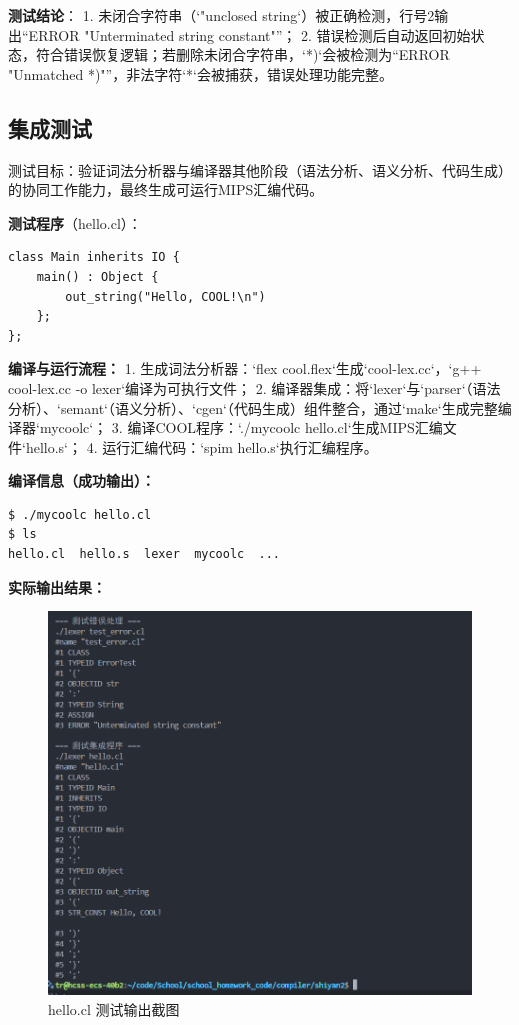 \documentclass[twocolumn]{article}
\begin{document}
\textbf{测试结论}：
1. 未闭合字符串（`"unclosed string`）被正确检测，行号2输出“ERROR "Unterminated string constant"”；
2. 错误检测后自动返回初始状态，符合错误恢复逻辑；若删除未闭合字符串，`*)`会被检测为“ERROR "Unmatched *)"”，非法字符`*`会被捕获，错误处理功能完整。

\subsection{集成测试}


测试目标：验证词法分析器与编译器其他阶段（语法分析、语义分析、代码生成）的协同工作能力，最终生成可运行MIPS汇编代码。

\textbf{测试程序}（hello.cl）：
\begin{lstlisting}[language=cool, caption={集成测试程序}]
class Main inherits IO {
    main() : Object {
        out_string("Hello, COOL!\n")
    };
};
\end{lstlisting}

\textbf{编译与运行流程：}
1. 生成词法分析器：`flex cool.flex`生成`cool-lex.cc`，`g++ cool-lex.cc -o lexer`编译为可执行文件；
2. 编译器集成：将`lexer`与`parser`（语法分析）、`semant`（语义分析）、`cgen`（代码生成）组件整合，通过`make`生成完整编译器`mycoolc`；
3. 编译COOL程序：`./mycoolc hello.cl`生成MIPS汇编文件`hello.s`；
4. 运行汇编代码：`spim hello.s`执行汇编程序。

\textbf{编译信息（成功输出）：}
\begin{verbatim}
$ ./mycoolc hello.cl
$ ls
hello.cl  hello.s  lexer  mycoolc  ...
\end{verbatim}

\textbf{实际输出结果：}
\begin{figure}[H]
    \centering
    \includegraphics[width=0.95\linewidth]{hello.png}  %
    \caption{hello.cl 测试输出截图}  %
\end{figure}
\end{document}
